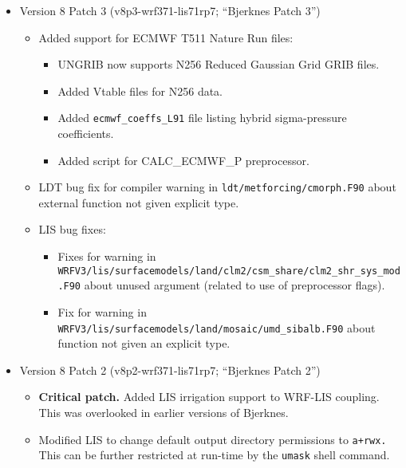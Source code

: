 \begin{itemize}
\item Version 8 Patch 3 (v8p3-wrf371-lis71rp7; ``Bjerknes Patch 3'')
  \begin{itemize}
  \item Added support for ECMWF T511 Nature Run files:
    \begin{itemize}
    \item UNGRIB now supports N256 Reduced Gaussian Grid GRIB files.
    \item Added Vtable files for N256 data.
    \item Added \texttt{ecmwf\_coeffs\_L91} file listing hybrid 
      sigma-pressure coefficients.
    \item Added script for CALC\_ECMWF\_P preprocessor.         
    \end{itemize}
  \item LDT bug fix for compiler warning in \texttt{ldt/metforcing/cmorph.F90}
    about external function not given explicit type.
  \item LIS bug fixes:
    \begin{itemize}
    \item Fixes for warning in\\
      \texttt{WRFV3/lis/surfacemodels/land/clm2/csm\_share/clm2\_shr\_sys\_mod.F90}
      about unused argument (related to use of preprocessor flags).
    \item Fix for warning in 
      \texttt{WRFV3/lis/surfacemodels/land/mosaic/umd\_sibalb.F90} about 
      function not given an explicit type.
    \end{itemize}     
  \end{itemize}
  
\item Version 8 Patch 2 (v8p2-wrf371-lis71rp7; ``Bjerknes Patch 2'')
  \begin{itemize}
  \item \textbf{Critical patch.}  Added LIS irrigation support to WRF-LIS
    coupling.  This was overlooked in earlier versions of Bjerknes.
    \item Modified LIS to change default output directory permissions to 
      \texttt{a+rwx.}  This can be further restricted at run-time by the 
      \texttt{umask} shell command.
  \end{itemize}


\end{itemize}
